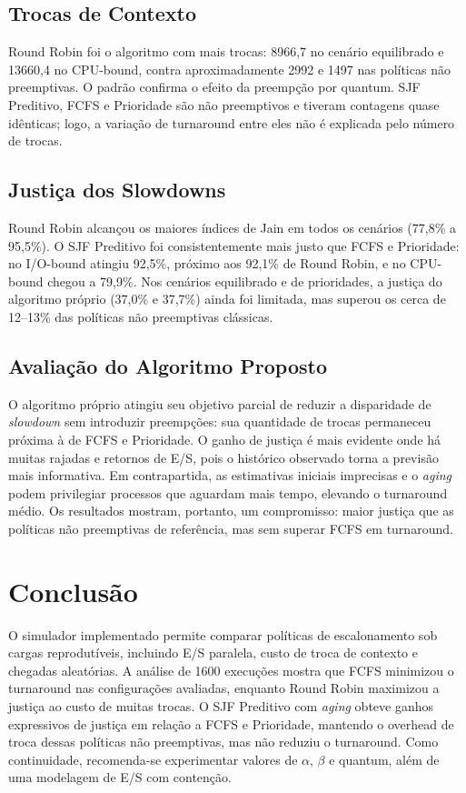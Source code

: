 \documentclass[conference]{IEEEtran}
\begin{document}
\subsection{Trocas de Contexto}

Round Robin foi o algoritmo com mais trocas: 8966,7 no cenário equilibrado e 13660,4 no CPU-bound, contra aproximadamente 2992 e 1497 nas políticas não preemptivas. O padrão confirma o efeito da preempção por quantum. SJF Preditivo, FCFS e Prioridade são não preemptivos e tiveram contagens quase idênticas; logo, a variação de turnaround entre eles não é explicada pelo número de trocas.

\subsection{Justiça dos Slowdowns}

Round Robin alcançou os maiores índices de Jain em todos os cenários (77,8\% a 95,5\%). O SJF Preditivo foi consistentemente mais justo que FCFS e Prioridade: no I/O-bound atingiu 92,5\%, próximo aos 92,1\% de Round Robin, e no CPU-bound chegou a 79,9\%. Nos cenários equilibrado e de prioridades, a justiça do algoritmo próprio (37,0\% e 37,7\%) ainda foi limitada, mas superou os cerca de 12--13\% das políticas não preemptivas clássicas.

\subsection{Avaliação do Algoritmo Proposto}

O algoritmo próprio atingiu seu objetivo parcial de reduzir a disparidade de \textit{slowdown} sem introduzir preempções: sua quantidade de trocas permaneceu próxima à de FCFS e Prioridade. O ganho de justiça é mais evidente onde há muitas rajadas e retornos de E/S, pois o histórico observado torna a previsão mais informativa. Em contrapartida, as estimativas iniciais imprecisas e o \textit{aging} podem privilegiar processos que aguardam mais tempo, elevando o turnaround médio. Os resultados mostram, portanto, um compromisso: maior justiça que as políticas não preemptivas de referência, mas sem superar FCFS em turnaround.

\FloatBarrier
\section{Conclusão}

O simulador implementado permite comparar políticas de escalonamento sob cargas reprodutíveis, incluindo E/S paralela, custo de troca de contexto e chegadas aleatórias. A análise de 1600 execuções mostra que FCFS minimizou o turnaround nas configurações avaliadas, enquanto Round Robin maximizou a justiça ao custo de muitas trocas. O SJF Preditivo com \textit{aging} obteve ganhos expressivos de justiça em relação a FCFS e Prioridade, mantendo o overhead de troca dessas políticas não preemptivas, mas não reduziu o turnaround. Como continuidade, recomenda-se experimentar valores de $\alpha$, $\beta$ e quantum, além de uma modelagem de E/S com contenção.



\end{document}
